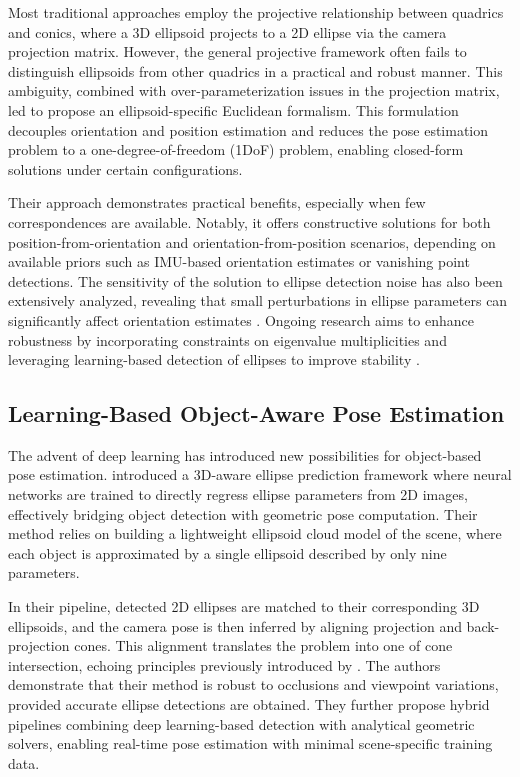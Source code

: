 Most traditional approaches employ the projective relationship between quadrics and conics, where a 3D ellipsoid projects to a 2D ellipse via the camera projection matrix. However, the general projective framework often fails to distinguish ellipsoids from other quadrics in a practical and robust manner. This ambiguity, combined with over-parameterization issues in the projection matrix, led \cite{Gaudilliere2023} to propose an ellipsoid-specific Euclidean formalism. This formulation decouples orientation and position estimation and reduces the pose estimation problem to a one-degree-of-freedom (1DoF) problem, enabling closed-form solutions under certain configurations.

Their approach demonstrates practical benefits, especially when few correspondences are available. Notably, it offers constructive solutions for both position-from-orientation and orientation-from-position scenarios, depending on available priors such as IMU-based orientation estimates or vanishing point detections. The sensitivity of the solution to ellipse detection noise has also been extensively analyzed, revealing that small perturbations in ellipse parameters can significantly affect orientation estimates \cite{gaudilliere2017perspective, gaudilliere2017perspective}. Ongoing research aims to enhance robustness by incorporating constraints on eigenvalue multiplicities and leveraging learning-based detection of ellipses to improve stability \cite{Zins2022}.

\subsection{Learning-Based Object-Aware Pose Estimation}

The advent of deep learning has introduced new possibilities for object-based pose estimation. \cite{Zins2022} introduced a 3D-aware ellipse prediction framework where neural networks are trained to directly regress ellipse parameters from 2D images, effectively bridging object detection with geometric pose computation. Their method relies on building a lightweight ellipsoid cloud model of the scene, where each object is approximated by a single ellipsoid described by only nine parameters.

In their pipeline, detected 2D ellipses are matched to their corresponding 3D ellipsoids, and the camera pose is then inferred by aligning projection and back-projection cones. This alignment translates the problem into one of cone intersection, echoing principles previously introduced by \cite{Gaudilliere2023}. The authors demonstrate that their method is robust to occlusions and viewpoint variations, provided accurate ellipse detections are obtained. They further propose hybrid pipelines combining deep learning-based detection with analytical geometric solvers, enabling real-time pose estimation with minimal scene-specific training data.

